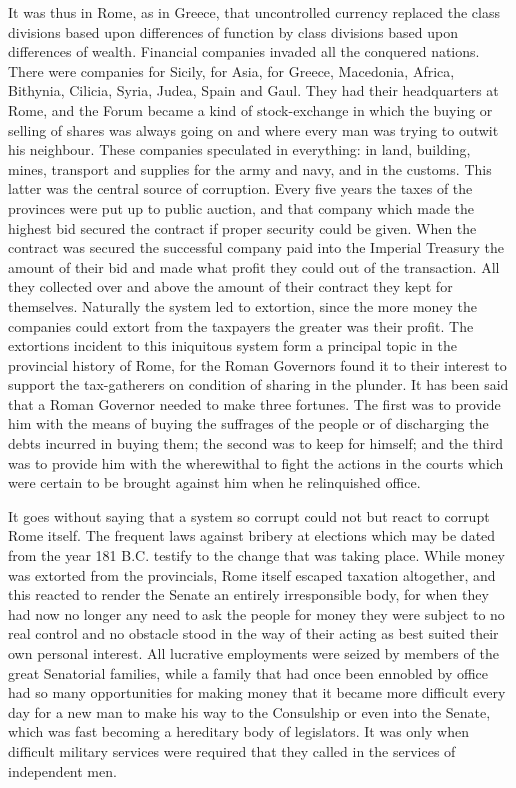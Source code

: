 \documentclass{book}
\begin{document}
It was thus in Rome, as in Greece, that uncontrolled currency replaced the class divisions based upon differences of function by class divisions based upon differences of wealth. Financial companies invaded all the conquered nations. There were companies for Sicily, for Asia, for Greece, Macedonia, Africa, Bithynia, Cilicia, Syria, Judea, Spain and Gaul. They had their headquarters at Rome, and the Forum became a kind of stock-exchange in which the buying or selling of shares was always going on and where every man was trying to outwit his neighbour. These companies speculated in everything: in land, building, mines, transport and supplies for the army and navy, and in the customs. This latter was the central source of corruption. Every five years the taxes of the provinces were put up to public auction, and that company which made the highest bid secured the contract if proper security could be given. When the contract was secured the successful company paid into the Imperial Treasury the amount of their bid and made what profit they could out of the transaction. All they collected over and above the amount of their contract they kept for themselves. Naturally the system led to extortion, since the more money the companies could extort from the taxpayers the greater was their profit. The extortions incident to this iniquitous system form a principal topic in the provincial history of Rome, for the Roman Governors found it to their interest to support the tax-gatherers on condition of sharing in the plunder. It has been said that a Roman Governor needed to make three fortunes. The first was to provide him with the means of buying the suffrages of the people or of discharging the debts incurred in buying them; the second was to keep for himself; and the third was to provide him with the wherewithal to fight the actions in the courts which were certain to be brought against him when he relinquished office.

It goes without saying that a system so corrupt could not but react to corrupt Rome itself. The frequent laws against bribery at elections which may be dated from the year 181 B.C. testify to the change that was taking place. While money was extorted from the provincials, Rome itself escaped taxation altogether, and this reacted to render the Senate an entirely irresponsible body, for when they had now no longer any need to ask the people for money they were subject to no real control and no obstacle stood in the way of their acting as best suited their own personal interest. All lucrative employments were seized by members of the great Senatorial families, while a family that had once been ennobled by office had so many opportunities for making money that it became more difficult every day for a new man to make his way to the Consulship or even into the Senate, which was fast becoming a hereditary body of legislators. It was only when difficult military services were required that they called in the services of independent men.
\end{document}

